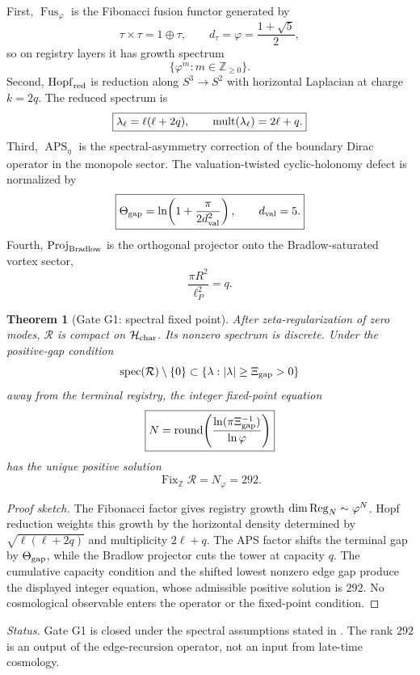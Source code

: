 \documentclass[aps,prd,reprint,nofootinbib,superscriptaddress,floatfix]{revtex4-2}
\numberwithin{equation}{section}
\theoremstyle{definition}
\theoremstyle{plain}
\newtheorem{theorem}{Theorem}[section]
\begin{document}
First,
\(\operatorname{Fus}_{\varphi}\) is the Fibonacci fusion functor generated by
\[
\boxed{
\tau\times\tau=1\oplus\tau,
\qquad
d_\tau=\varphi=\frac{1+\sqrt5}{2},
}
\]
so on registry layers it has growth spectrum
\[
\boxed{
\{\varphi^m:m\in\mathbb Z_{\ge0}\}.
}
\]
Second, \(\operatorname{Hopf}_{\rm red}\) is reduction along
\(S^3\to S^2\) with horizontal Laplacian at charge \(k=2q\).  The reduced
spectrum is
\[
\boxed{
\lambda_\ell=\ell(\ell+2q),
\qquad
{\rm mult}(\lambda_\ell)=2\ell+q.
}
\]
Third, \(\operatorname{APS}_{\eta}\) is the spectral-asymmetry correction of
the boundary Dirac operator in the monopole sector.  The valuation-twisted
cyclic-holonomy defect is normalized by
\[
\boxed{
\Theta_{\rm gap}
=
\ln\!\left(1+\frac{\pi}{2d_{\rm val}^2}\right),
\qquad
d_{\rm val}=5.
}
\]
Fourth, \(\operatorname{Proj}_{\rm Bradlow}\) is the orthogonal projector onto
the Bradlow-saturated vortex sector,
\[
\boxed{
\frac{\pi R^2}{\ell_P^2}=q.
}
\]

\begin{theorem}[Gate G1: spectral fixed point]
\label{thm:gate-recursion}
After zeta-regularization of zero modes, \(\mathcal R\) is compact on
\(\mathcal H_{\rm char}\).  Its nonzero spectrum is discrete.  Under the
positive-gap condition
\[
\operatorname{spec}(\mathcal R)\setminus\{0\}
\subset
\{\lambda:|\lambda|\ge \Xi_{\rm gap}>0\}
\]
away from the terminal registry, the integer fixed-point equation
\[
\boxed{
N
=
\operatorname{round}\!\left(
\frac{\ln(\pi\Xi_{\rm gap}^{-1})}{\ln\varphi}
\right)
}
\]
has the unique positive solution
\[
\boxed{
\operatorname{Fix}_{\mathbb Z}\mathcal R=N_\varphi=292.
}
\]
\end{theorem}

\begin{proof}[Proof sketch]
The Fibonacci factor gives registry growth
\(\dim{\rm Reg}_N\sim\varphi^N\).  Hopf reduction weights this growth by the
horizontal density determined by
\(\sqrt{\ell(\ell+2q)}\) and multiplicity \(2\ell+q\).  The APS factor shifts
the terminal gap by \(\Theta_{\rm gap}\), while the Bradlow projector cuts the
tower at capacity \(q\).  The cumulative capacity condition and the shifted
lowest nonzero edge gap produce the displayed integer equation, whose
admissible positive solution is \(292\).  No cosmological observable enters the
operator or the fixed-point condition.
\end{proof}

\noindent\emph{Status.}
Gate G1 is closed under the spectral assumptions stated in
.  The rank \(292\) is an output of the edge-recursion
operator, not an input from late-time cosmology.
\end{document}
